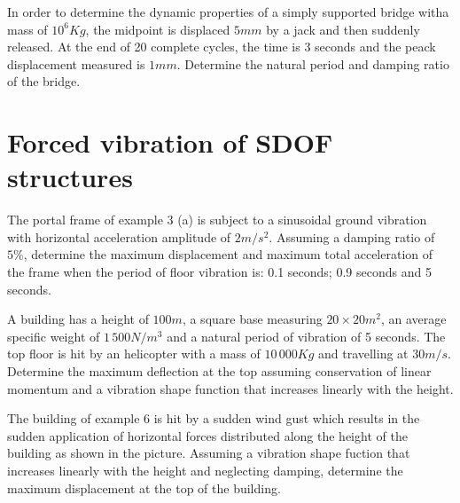 \documentclass{problems}
\begin{document}
In order to determine the dynamic properties of a simply supported bridge witha mass of $10^6Kg$, the midpoint is displaced $5mm$ by a jack and then suddenly released. At the end of 20 complete cycles, the time is 3 seconds and the peack displacement measured is $1mm$. Determine the natural period and damping ratio of the bridge.

\begin{center}
\end{center}



\section{Forced vibration of SDOF structures}


 The portal frame of example 3 (a) is subject to a sinusoidal ground vibration with horizontal acceleration amplitude of $2m/s^2$. Assuming a damping ratio of $5\%$, determine the maximum displacement and maximum total acceleration of the frame when the period of floor vibration is: 0.1 seconds; 0.9 seconds and 5 seconds.

\begin{center}
\end{center}


 A building has a height of $100m$, a square base measuring $20\times20m^2$, an average specific weight of $1\,500N/m^3$ and a natural period of vibration of 5 seconds. The top floor is hit by an helicopter with a mass of $10\,000Kg$ and travelling at $30m/s$. Determine the maximum deflection at the top assuming conservation of linear momentum and a vibration shape function that increases linearly with the height.

\begin{center}
\end{center}


 The building of example 6 is hit by a sudden wind gust which results in the sudden application of horizontal forces distributed along the height of the building as shown in the picture. Assuming a vibration shape fuction that increases linearly with the height and neglecting damping, determine the maximum displacement at the top of the building.

\begin{center}
\end{center}
\end{document}
